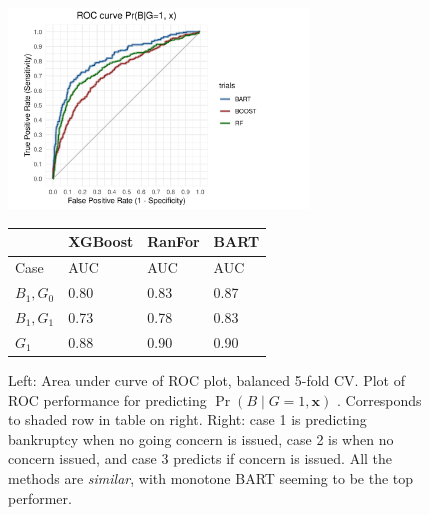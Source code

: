 \documentclass[aoas,preprint, 11pt, dvipsnames, table, x11name]{imsart}
\renewcommand{\bm}[1]{\mathbf{#1}}
\theoremstyle{remark}
\begin{document}
	\begin{figure}[t]
		
		\begin{minipage}[t]{.5\textwidth}
			
			
			\includegraphics[width=8cm]{roc_pbg1_cv_png}
			
			
			
		\end{minipage}\hfill
		\begin{minipage}[t][-2.2cm][b]{.5\textwidth}	
			\centering
			\begin{tabular}{P{1.1cm}P{1.2cm}P{1.25cm}P{1.25cm}}
				&\color{BrickRed}\textbf{XGBoost}&\color{darkgreen}\textbf{RanFor}&\color{navy}\textbf{BART}\\ \midrule
				
				Case   & AUC  & AUC & AUC  \\ \midrule
				$B_1, G_0$ &0.80&0.83&0.87\\ %
				$B_1, G_1$ &0.73 &0.78&0.83 \\%
				$G_1$ &0.88&0.90&0.90 \\ \bottomrule%
			\end{tabular}
			
			
		\end{minipage}
		\caption{Left: Area under curve of ROC plot, balanced 5-fold CV.  Plot of ROC performance for predicting $\Pr(B\mid G=1, \bm{x})$ .  Corresponds to shaded row in table on right.  Right:  case 1 is predicting bankruptcy when no going concern is issued, case 2 is when no concern issued, and case 3 predicts if concern is issued.  All the methods are \emph{similar}, with monotone BART seeming to be the top performer.}
		\label{roc_plot}
	\end{figure}
\end{document}

